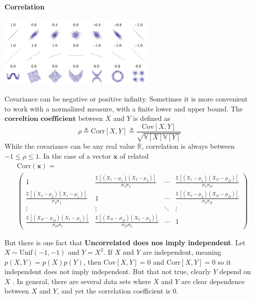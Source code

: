\documentclass[10pt,landscape]{article}
\newcommand{\cov}{\textrm{Cov}}
\newcommand{\corr}{\textrm{Corr}}
\newcommand{\Unif}{\textrm{Unif}}
\newcommand{\var}{\mathbb{V}}
\newcommand{\inp}{\textbf{x}}
\newcommand{\R}{\mathbb{R}}
\begin{document}
\begin{multicols*}{3}
\textbf{Correlation}

\begin{minipage}{\linewidth}
    \centering
    \includegraphics[width=3in]{figures/correlation.PNG}
\end{minipage}

Covariance can be negative or positive infinity. Sometimes it is more convenient to work with a normalized measure, with a finite lower and upper bound. The $\textbf{correltion coefficient}$ between $X$ and $Y$ is defined as
\[
    \rho\triangleq\corr[X,Y]\triangleq\frac{\cov[X,Y]}{\sqrt{\var[X]\var[Y]}}
\]
While the covariance can be any real value $\R$, correlation is always between $-1\leq\rho\leq1$. In the case of a vector $\inp$ of related 
\begin{align*}
    & \corr(\inp)= \\ 
    &\begin{pmatrix}
    1 & \!\!\!\!\!\!\! \frac{\mathbb{E}[(X_1 - \mu_1)(X_2 - \mu_2)]}{\sigma_1 \sigma_2} & \!\!\!\!\!\!\! \cdots & \!\!\!\!\!\!\! \frac{\mathbb{E}[(X_1 - \mu_1)(X_D - \mu_D)]}{\sigma_1 \sigma_D} \\
    \frac{\mathbb{E}[(X_2 - \mu_2)(X_1 - \mu_1)]}{\sigma_2 \sigma_1} & \!\!\!\!\!\!\! 1 & \!\!\!\!\!\!\!\cdots & \!\!\!\!\!\!\!\frac{\mathbb{E}[(X_2 - \mu_2)(X_D - \mu_D)]}{\sigma_2 \sigma_D} \\
    \vdots &\!\!\!\!\!\!\! \vdots &\!\!\!\!\!\!\! \ddots & \!\!\!\!\!\!\!\vdots \\ 
    \frac{\mathbb{E}[(X_D - \mu_D)(X_1 - \mu_1)]}{\sigma_D \sigma_1} &\!\!\!\!\!\!\! \frac{\mathbb{E}[(X_D - \mu_D)(X_2 - \mu_2)]}{\sigma_D \sigma_2} & \!\!\!\!\!\!\!\cdots &\!\!\!\!\!\!\! 1
    \end{pmatrix}
\end{align*}

But there is one fact that \textbf{Uncorrelated does nos imply independent}. Let $X\sim\Unif(-1,-1)$ and $Y=X^2$. If $X$ and $Y$ are independent, meaning $p(X,Y)=p(X)p(Y)$, then $\cov[X,Y]=0$ and $\corr[X,Y]=0$ so it independent does not imply independent. But that not true, clearly $Y$ depend on $X$ . In general, there are several data sets where $X$ and $Y$ are clear dependence between $X$ and $Y$, and yet the correlation coefficient is $0$.


\end{multicols*}
\end{document}

